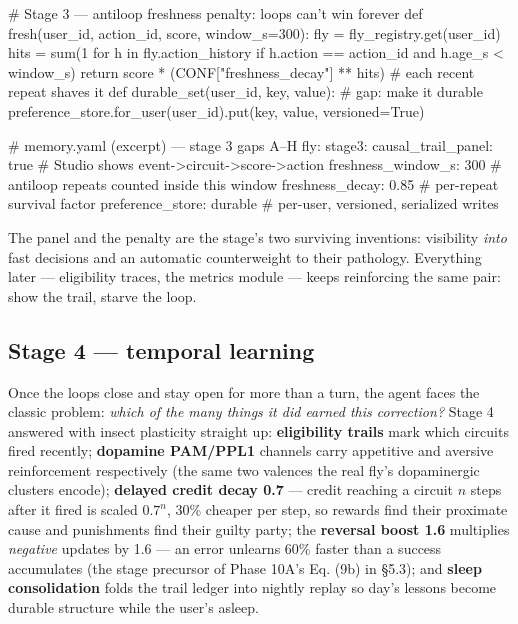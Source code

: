 \documentclass[11pt]{article}
\begin{document}
\begin{CodeBlock}
# Stage 3 — antiloop freshness penalty: loops can't win forever
def fresh(user_id, action_id, score, window_s=300):
    fly = fly_registry.get(user_id)
    hits = sum(1 for h in fly.action_history
               if h.action == action_id and h.age_s < window_s)
    return score * (CONF["freshness_decay"] ** hits)   # each recent repeat shaves it
def durable_set(user_id, key, value):                  # gap: make it durable
    preference_store.for_user(user_id).put(key, value, versioned=True)
\end{CodeBlock}

\begin{CodeBlock}
# memory.yaml (excerpt) — stage 3 gaps A–H
fly:
  stage3:
    causal_trail_panel: true      # Studio shows event->circuit->score->action
    freshness_window_s: 300       # antiloop repeats counted inside this window
    freshness_decay: 0.85         # per-repeat survival factor
    preference_store: durable     # per-user, versioned, serialized writes
\end{CodeBlock}

The panel and the penalty are the stage's two surviving inventions: visibility \emph{into} fast decisions and an automatic counterweight to their pathology. Everything later — eligibility traces, the metrics module — keeps reinforcing the same pair: show the trail, starve the loop.

\subsection{Stage 4 — temporal learning}

Once the loops close and stay open for more than a turn, the agent faces the classic problem: \emph{which of the many things it did earned this correction?} Stage 4 answered with insect plasticity straight up: \textbf{eligibility trails} mark which circuits fired recently; \textbf{dopamine PAM/PPL1} channels carry appetitive and aversive reinforcement respectively (the same two valences the real fly's dopaminergic clusters encode); \textbf{delayed credit decay 0.7} — credit reaching a circuit \(n\) steps after it fired is scaled \(0.7^n\), 30\% cheaper per step, so rewards find their proximate cause and punishments find their guilty party; the \textbf{reversal boost 1.6} multiplies \emph{negative} updates by 1.6 — an error unlearns 60\% faster than a success accumulates (the stage precursor of Phase 10A's Eq. (9b) in §5.3); and \textbf{sleep consolidation} folds the trail ledger into nightly replay so day's lessons become durable structure while the user's asleep.
\end{document}

